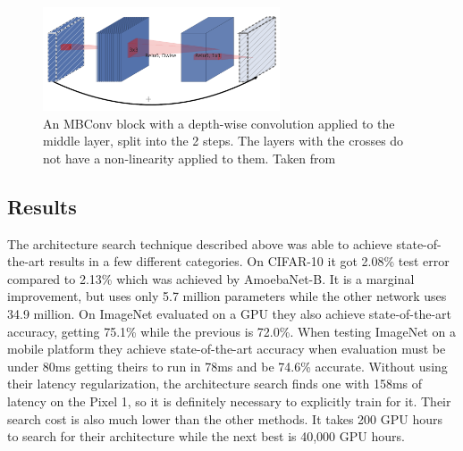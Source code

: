 \documentclass{ieee}
\begin{document}
\begin{figure}[h]
    \begin{center}
    \includegraphics[width=7cm]{images/mbconv.png}
    \end{center}
    \label{mbconv_fig}
    \caption{An MBConv block with a depth-wise convolution applied to the middle layer, split into the 2 steps. The layers with the crosses do not have a non-linearity applied to them. Taken from \cite{sandler_howard_zhu_zhmoginov_chen_2018}}
\end{figure}

\subsection{Results}

The architecture search technique described above was able to achieve state-of-the-art results in a few different categories. On CIFAR-10 it got 2.08\% test error compared to 2.13\% which was achieved by AmoebaNet-B. It is a marginal improvement, but uses only 5.7 million parameters while the other network uses 34.9 million. On ImageNet evaluated on a GPU they also achieve state-of-the-art accuracy, getting 75.1\% while the previous is 72.0\%. When testing ImageNet on a mobile platform they achieve state-of-the-art accuracy when evaluation must be under 80ms getting theirs to run in 78ms and be 74.6\% accurate. Without using their latency regularization, the architecture search finds one with 158ms of latency on the Pixel 1, so it is definitely necessary to explicitly train for it. Their search cost is also much lower than the other methods. It takes 200 GPU hours to search for their architecture while the next best is 40,000 GPU hours. 


 
\end{document}
